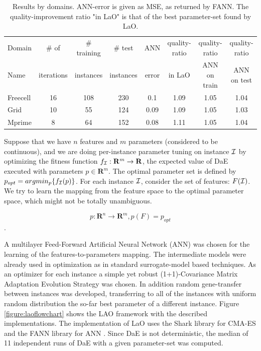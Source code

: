 \documentclass{sig-alt-release2}
\begin{document}
\begin{table}[ht] 
\centering
\begin{tabular}{l c c c c c c c}
\hline\hline
Domain & \# of & \# training & \# test &  ANN & quality-ratio & quality-ratio & quality-ratio \\ 
Name & iterations  & instances &  instances &  error & in LaO & ANN on train & ANN on test \\ 
\hline
Freecell& 16 & 108 & 230 & 0.1 & 1.09 & 1.05 & 1.04  \\
Grid & 10 & 55 & 124 & 0.09 & 1.09 & 1.05 & 1.03  \\
Mprime & 8 & 64 & 152 & 0.08 & 1.11 & 1.05 & 1.04   \\
\hline
\end{tabular}
\caption{Results by domains. ANN-error is given as MSE, as returned by FANN. The quality-improvement ratio "in LaO" is that of the best parameter-set found by LaO.}
\label{table:domains}
\end{table} 

Suppose that we have $n$ features and $m$ parameters (considered to be continuous), and we are doing per-instance parameter tuning on instance $\cal I$ by optimizing the fitness function \begin{math}f_{\cal I}:\mathbf{R}^m\to \mathbf{R} \end{math}, the expected value of DaE executed with parameters \begin{math} p \in \mathbf{R}^m \end{math}. The optimal parameter set is defined by \begin{math} p_{opt}=argmin_p\{f_{\cal I}(p)\} \end{math}. For each instance $\cal I$, consider the set of features: \begin{math} F({\cal I}) \end{math}. We try to learn the mapping from the feature space to the optimal parameter space, which might not be totally unambiguous.

\begin{equation} p: \mathbf{R}^n \to \mathbf{R}^m, p(F)=p_{opt} \end{equation}.	

A multilayer Feed-Forward Artificial Neural Network (ANN) was chosen for the learning of the features-to-parameters mapping. The intermediate models were already used in optimization as in standard surrogate-model based techniques. As an optimizer for each instance a simple yet robust (1+1)-Covariance Matrix Adaptation Evolution Strategy \cite{hansen2001ecj} was chosen. In addition random gene-transfer between instances was developed, transferring to all of the instances with uniform random distribution the so-far best parameter of a different instance. Figure \ref{figure:laoflowchart} shows the LAO framework with the described implementations. The implementation of LaO uses the Shark library \cite{shark08} for CMA-ES and the FANN library for ANN \cite{nissen}. Since DaE is not deterministic, the median of 11 independent runs of DaE with a given parameter-set was computed.
\end{document}
